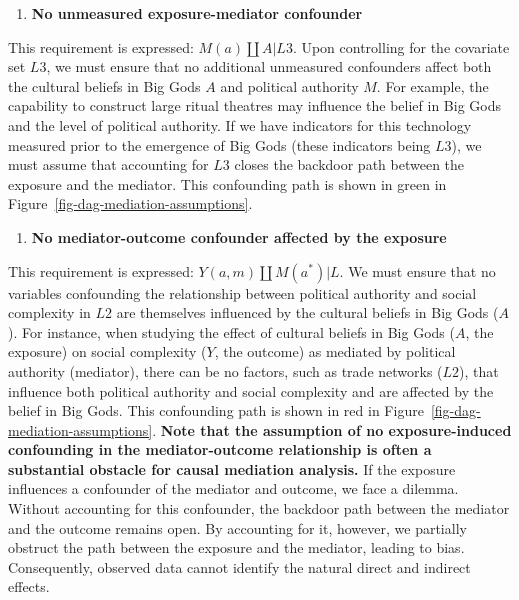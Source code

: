 \documentclass[
  singlecolumn]{article}
\providecommand{\tightlist}{%
  \setlength{\itemsep}{0pt}\setlength{\parskip}{0pt}}\usepackage{longtable,booktabs,array}
\begin{document}
\begin{enumerate}
\def\labelenumi{\arabic{enumi}.}
\setcounter{enumi}{2}
\tightlist
\item
  \textbf{No unmeasured exposure-mediator confounder}
\end{enumerate}

This requirement is expressed: \(M(a) \coprod A | L3\). Upon controlling
for the covariate set \(L3\), we must ensure that no additional
unmeasured confounders affect both the cultural beliefs in Big Gods
\(A\) and political authority \(M\). For example, the capability to
construct large ritual theatres may influence the belief in Big Gods and
the level of political authority. If we have indicators for this
technology measured prior to the emergence of Big Gods (these indicators
being \(L3\)), we must assume that accounting for \(L3\) closes the
backdoor path between the exposure and the mediator. This confounding
path is shown in green in Figure~\ref{fig-dag-mediation-assumptions}.

\begin{enumerate}
\def\labelenumi{\arabic{enumi}.}
\setcounter{enumi}{3}
\tightlist
\item
  \textbf{No mediator-outcome confounder affected by the exposure}
\end{enumerate}

This requirement is expressed: \(Y(a,m) \coprod M(a^*) | L\). We must
ensure that no variables confounding the relationship between political
authority and social complexity in \(L2\) are themselves influenced by
the cultural beliefs in Big Gods (\(A\)). For instance, when studying
the effect of cultural beliefs in Big Gods (\(A\), the exposure) on
social complexity (\(Y\), the outcome) as mediated by political
authority (mediator), there can be no factors, such as trade networks
(\(L2\)), that influence both political authority and social complexity
and are affected by the belief in Big Gods. This confounding path is
shown in red in Figure~\ref{fig-dag-mediation-assumptions}. \textbf{Note
that the assumption of no exposure-induced confounding in the
mediator-outcome relationship is often a substantial obstacle for causal
mediation analysis.} If the exposure influences a confounder of the
mediator and outcome, we face a dilemma. Without accounting for this
confounder, the backdoor path between the mediator and the outcome
remains open. By accounting for it, however, we partially obstruct the
path between the exposure and the mediator, leading to bias.
Consequently, observed data cannot identify the natural direct and
indirect effects.
\end{document}
